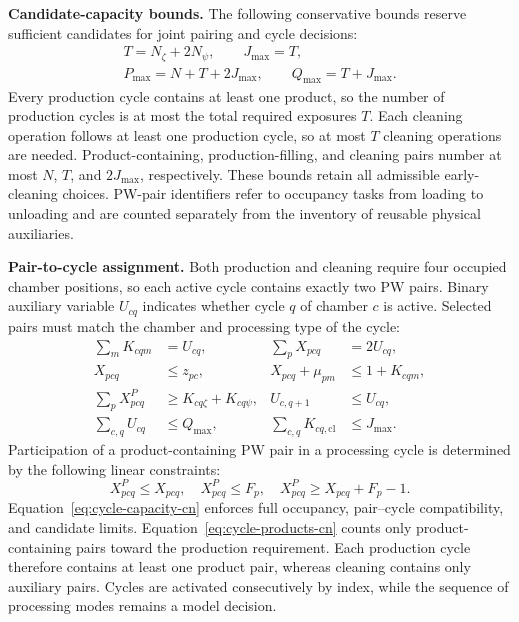 \documentclass[final,5p,times,twocolumn]{elsarticle}
\begin{document}
\noindent\textbf{Candidate-capacity bounds.}
The following conservative bounds reserve sufficient candidates for joint pairing and cycle decisions:
\begin{equation}
\begin{gathered}
T=N_{\zeta}+2N_{\psi},\qquad J_{\max}=T,\\
P_{\max}=N+T+2J_{\max},\qquad Q_{\max}=T+J_{\max}.
\end{gathered}
\label{eq:candidate-bounds-cn}
\end{equation}
Every production cycle contains at least one product, so the number of production cycles is at most the total required exposures $T$. Each cleaning operation follows at least one production cycle, so at most $T$ cleaning operations are needed. Product-containing, production-filling, and cleaning pairs number at most $N$, $T$, and $2J_{\max}$, respectively. These bounds retain all admissible early-cleaning choices. PW-pair identifiers refer to occupancy tasks from loading to unloading and are counted separately from the inventory of reusable physical auxiliaries.

\noindent\textbf{Pair-to-cycle assignment.}
Both production and cleaning require four occupied chamber positions, so each active cycle contains exactly two PW pairs. Binary auxiliary variable $U_{cq}$ indicates whether cycle $q$ of chamber $c$ is active. Selected pairs must match the chamber and processing type of the cycle:
\begin{equation}
\begin{aligned}
\sum_mK_{cqm}&=U_{cq}, &\sum_pX_{pcq}&=2U_{cq},\\
X_{pcq}&\le z_{pc}, &X_{pcq}+\mu_{pm}&\le1+K_{cqm},\\
\sum_pX^P_{pcq}&\ge K_{cq\zeta}+K_{cq\psi}, &U_{c,q+1}&\le U_{cq},\\
\sum_{c,q}U_{cq}&\le Q_{\max}, &\sum_{c,q}K_{cq,\mathrm{cl}}&\le J_{\max}.
\end{aligned}
\label{eq:cycle-capacity-cn}
\end{equation}
Participation of a product-containing PW pair in a processing cycle is determined by the following linear constraints:
\begin{equation}
X^P_{pcq}\le X_{pcq},\quad X^P_{pcq}\le F_p,\quad
X^P_{pcq}\ge X_{pcq}+F_p-1.
\label{eq:cycle-products-cn}
\end{equation}
Equation~\eqref{eq:cycle-capacity-cn} enforces full occupancy, pair--cycle compatibility, and candidate limits. Equation~\eqref{eq:cycle-products-cn} counts only product-containing pairs toward the production requirement. Each production cycle therefore contains at least one product pair, whereas cleaning contains only auxiliary pairs. Cycles are activated consecutively by index, while the sequence of processing modes remains a model decision.
\end{document}
